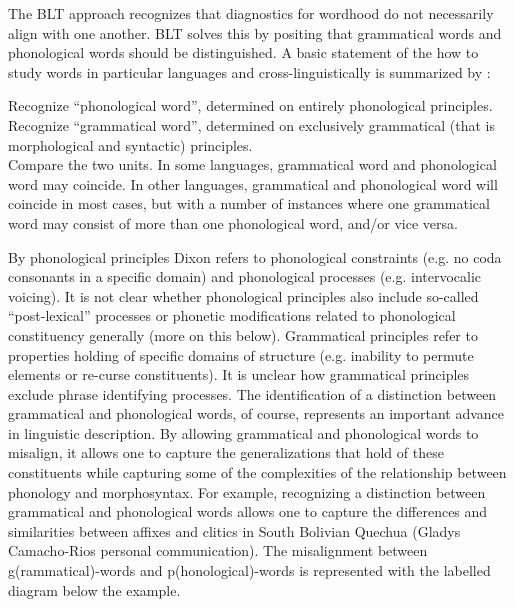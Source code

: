 \documentclass[output=paper,hidelinks]{langscibook}
\begin{document}
The BLT approach recognizes that diagnostics for wordhood do not necessarily align with one another. BLT solves this by positing that grammatical words and phonological words should be distinguished. A basic statement of the how to study words in particular languages and cross-linguistically is summarized by \citet[10]{dixon2010basica}:

\ea \label{statements:bltprinciples}
    \ea Recognize ``phonological word'', determined on entirely phonological principles. \\
    \ex Recognize ``grammatical word'', determined on exclusively grammatical (that is morphological and syntactic) principles. \\
    \ex Compare the two units. In some languages, grammatical word and phonological word may coincide. In other languages, grammatical and phonological word will coincide in most cases, but with a number of instances where one grammatical word may consist of more than one phonological word, and/or vice versa.
    \z
\z

By phonological principles Dixon refers to phonological constraints (e.g. no coda consonants in a specific domain) and phonological processes (e.g. intervocalic voicing). It is not clear whether phonological principles also include so-called ``post-lexical'' processes or phonetic modifications related to phonological constituency generally (more on this below). Grammatical principles refer to properties holding of specific domains of structure (e.g. inability to permute elements or re-curse constituents). It is unclear how grammatical principles exclude phrase identifying processes. The identification of a distinction between grammatical and phonological words, of course, represents an important advance in linguistic description. By allowing grammatical and phonological words to misalign, it allows one to capture the generalizations that hold of these constituents while capturing some of the complexities of the relationship between phonology and morphosyntax. For example, recognizing a distinction between grammatical and phonological words allows one to capture the differences and similarities between affixes and clitics in South Bolivian Quechua (Gladys Camacho-Rios personal communication). The misalignment between g(rammatical)-words and p(honological)-words is represented with the labelled diagram below the example.

\end{document}
